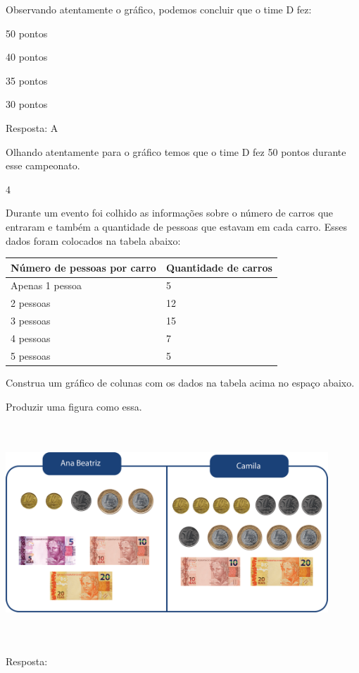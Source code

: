 \begin{escolha}
\begin{escolha}
Observando atentamente o gráfico, podemos concluir que o time D fez:

\begin{escolha}
\item
  50 pontos
\item
  40 pontos
\item
  35 pontos
\item
  30 pontos
\end{escolha}

Resposta: A

Olhando atentamente para o gráfico temos que o time D fez 50 pontos
durante esse campeonato.

\num{4}

Durante um evento foi colhido as informações sobre o número de carros
que entraram e também a quantidade de pessoas que estavam em cada carro.
Esses dados foram colocados na tabela abaixo:

\begin{longtable}[]{@{}ll@{}}
\toprule
Número de pessoas por carro & Quantidade de carros\tabularnewline
\midrule
\endhead
Apenas 1 pessoa & 5\tabularnewline
2 pessoas & 12\tabularnewline
3 pessoas & 15\tabularnewline
4 pessoas & 7\tabularnewline
5 pessoas & 5\tabularnewline
\bottomrule
\end{longtable}

Construa um gráfico de colunas com os dados na tabela acima no espaço
abaixo.

Produzir uma figura como essa.

\includegraphics[width=4.76708in,height=3.21695in]{media/image95.png}

Resposta:


\end{escolha}
\end{escolha}
